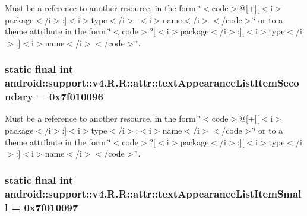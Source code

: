 Must be a reference to another resource, in the form \char`\"{}$<$code$>$@\mbox{[}+\mbox{]}\mbox{[}$<$i$>$package$<$/i$>$:\mbox{]}$<$i$>$type$<$/i$>$:$<$i$>$name$<$/i$>$$<$/code$>$\char`\"{} or to a theme attribute in the form \char`\"{}$<$code$>$?\mbox{[}$<$i$>$package$<$/i$>$:\mbox{]}\mbox{[}$<$i$>$type$<$/i$>$:\mbox{]}$<$i$>$name$<$/i$>$$<$/code$>$\char`\"{}. \hypertarget{classandroid_1_1support_1_1v4_1_1_r_1_1attr_146163ad5fca51abe9580209a0323038}{
\subsubsection[{textAppearanceListItemSecondary}]{\setlength{\rightskip}{0pt plus 5cm}static final int android::support::v4.R.R::attr::textAppearanceListItemSecondary = 0x7f010096}}
\label{classandroid_1_1support_1_1v4_1_1_r_1_1attr_146163ad5fca51abe9580209a0323038}


Must be a reference to another resource, in the form \char`\"{}$<$code$>$@\mbox{[}+\mbox{]}\mbox{[}$<$i$>$package$<$/i$>$:\mbox{]}$<$i$>$type$<$/i$>$:$<$i$>$name$<$/i$>$$<$/code$>$\char`\"{} or to a theme attribute in the form \char`\"{}$<$code$>$?\mbox{[}$<$i$>$package$<$/i$>$:\mbox{]}\mbox{[}$<$i$>$type$<$/i$>$:\mbox{]}$<$i$>$name$<$/i$>$$<$/code$>$\char`\"{}. \hypertarget{classandroid_1_1support_1_1v4_1_1_r_1_1attr_1949dd6e6dda5f239bb132cc79698407}{
\subsubsection[{textAppearanceListItemSmall}]{\setlength{\rightskip}{0pt plus 5cm}static final int android::support::v4.R.R::attr::textAppearanceListItemSmall = 0x7f010097}}
\label{classandroid_1_1support_1_1v4_1_1_r_1_1attr_1949dd6e6dda5f239bb132cc79698407}


